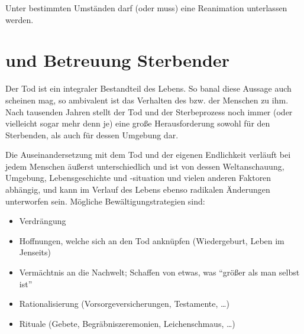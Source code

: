 \Text
{{\TxBeschreibung}}%
{%
\label{topic:reanimation-unterlassung}%
Unter bestimmten Umständen darf (oder muss) eine Reanimation unterlassen werden.
}%


\clearpage%

\section{ und Betreuung Sterbender}

\Text
{{\TxBeschreibung}}%
{%
\label{topic:sterbende-betreuung}%
Der Tod ist ein integraler Bestandteil des Lebens. So banal
diese Aussage auch scheinen mag, so ambivalent ist das
Verhalten des bzw. der Menschen zu ihm. Nach tausenden
Jahren stellt der Tod und der Sterbeprozess noch immer
(oder vielleicht sogar mehr denn je) eine große
Herausforderung sowohl für den Sterbenden, als auch für
dessen Umgebung dar. 





Die Auseinandersetzung mit dem Tod und der eigenen
Endlichkeit verläuft bei jedem Menschen äußerst
unterschiedlich und ist von dessen Weltanschauung, Umgebung,
Lebensgeschichte und -situation und vielen anderen Faktoren
abhängig, und kann im Verlauf des Lebens ebenso radikalen
Änderungen unterworfen sein. Mögliche Bewältigungstrategien
sind:

\begin{itemize}
  \item Verdrängung
  \item Hoffnungen, welche sich an den Tod anknüpfen
  (Wiedergeburt, Leben im Jenseits)
  \item Vermächtnis an die Nachwelt; Schaffen von etwas, was
 \enquote{größer als man selbst ist}
  \item Rationalisierung (Vorsorgeversicherungen,
  Testamente, \ldots)
  \item Rituale (Gebete, Begräbniszeremonien,
  Leichenschmaus, \ldots)
\end{itemize}
}%


\begin{Synopsis}
\end{Synopsis}








